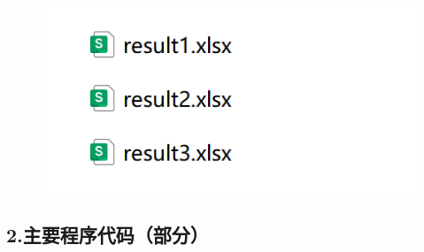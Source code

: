 \documentclass[12pt]{article}
\begin{document}
\begin{CJK}{UTF8}{gbsn}
		\begin{figure}[H]
			\includegraphics[width=0.4\linewidth]{pic/zc2}
		\end{figure}
		
		\newpage
		\subsection*{2.主要程序代码（部分）}
		
		
	\end{CJK}
\end{document}
